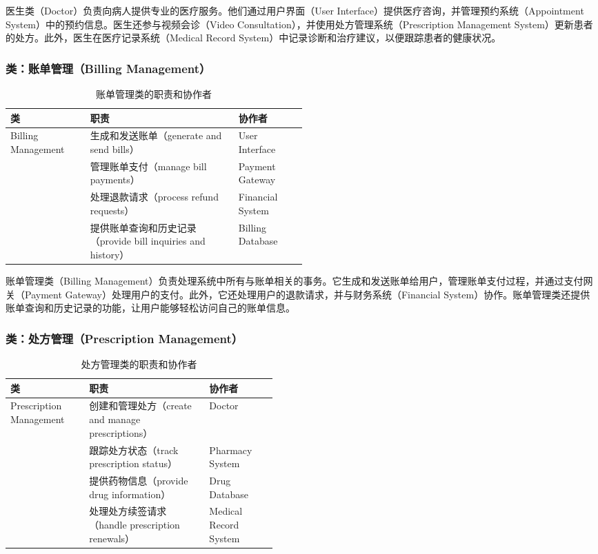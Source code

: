 医生类（Doctor）负责向病人提供专业的医疗服务。他们通过用户界面（User Interface）提供医疗咨询，并管理预约系统（Appointment System）中的预约信息。医生还参与视频会诊（Video Consultation），并使用处方管理系统（Prescription Management System）更新患者的处方。此外，医生在医疗记录系统（Medical Record System）中记录诊断和治疗建议，以便跟踪患者的健康状况。
\subsubsection{类：账单管理（Billing Management）}
\begin{table}[htbp]
	\centering
	\begin{tabular}{|l|p{0.5\linewidth}|l|}
		\hline
		\textbf{类} & \textbf{职责} & \textbf{协作者} \\
		\hline
		Billing Management & 生成和发送账单（generate and send bills） & User Interface \\
		& 管理账单支付（manage bill payments） & Payment Gateway \\
		& 处理退款请求（process refund requests） & Financial System \\
		& 提供账单查询和历史记录（provide bill inquiries and history） & Billing Database \\
		\hline
	\end{tabular}
	\caption{账单管理类的职责和协作者}
	\label{tab:billing_management}
\end{table}

账单管理类（Billing Management）负责处理系统中所有与账单相关的事务。它生成和发送账单给用户，管理账单支付过程，并通过支付网关（Payment Gateway）处理用户的支付。此外，它还处理用户的退款请求，并与财务系统（Financial System）协作。账单管理类还提供账单查询和历史记录的功能，让用户能够轻松访问自己的账单信息。

\subsubsection{类：处方管理（Prescription Management）}
\begin{table}[htbp]
	\centering
	\begin{tabular}{|l|p{0.45\linewidth}|l|}
		\hline
		\textbf{类} & \textbf{职责} & \textbf{协作者} \\
		\hline
		Prescription Management & 创建和管理处方（create and manage prescriptions） & Doctor \\
		& 跟踪处方状态（track prescription status） & Pharmacy System \\
		& 提供药物信息（provide drug information） & Drug Database \\
		& 处理处方续签请求（handle prescription renewals） & Medical Record System \\
		\hline
	\end{tabular}
	\caption{处方管理类的职责和协作者}
	\label{tab:prescription_management}
\end{table}

